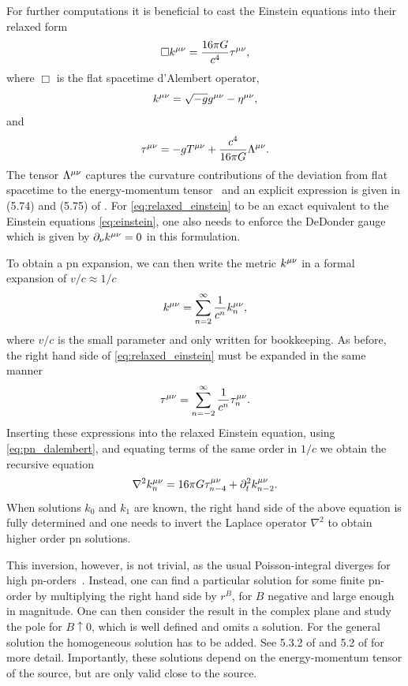 For further computations it is beneficial to cast the Einstein equations into their relaxed form
\begin{equation}\label{eq:relaxed_einstein}
\Box k^{\mu\nu} = \frac{16 \pi G}{c^4}\tau^{\mu\nu},
\end{equation}
where $\Box$ is the flat spacetime d'Alembert operator,
\begin{equation}
k^{\mu\nu} = \sqrt{-g}g^{\mu\nu}-\eta^{\mu\nu},
\end{equation}
and
\begin{equation}
\tau^{\mu\nu}=-gT^{\mu\nu} + \frac{c^4}{16\pi G}\Lambda^{\mu\nu}.
\end{equation}
The tensor $\Lambda^{\mu\nu}$ captures the curvature contributions of the deviation from flat spacetime to the energy-momentum tensor~\cite{Blanchet:2006aaa} %
and an explicit expression is given in (5.74) and (5.75) of \cite{Maggiore:2008aaa}. For \eqref{eq:relaxed_einstein} to be an exact equivalent to the Einstein equations \eqref{eq:einstein}, one also needs to enforce the DeDonder gauge which is given by $\partial_\nu k^{\mu\nu}=0$ in this formulation.

To obtain a \acrshort{pn} expansion, we can then write the metric $k^{\mu\nu}$ in a formal expansion of $v/c\approx 1/c$
\begin{equation}
k^{\mu\nu} = \sum_{n=2}^\infty\frac{1}{c^n} k^{\mu\nu}_n,
\end{equation}
where $v/c$ is the small parameter and only written for bookkeeping. As before, the right hand side of \eqref{eq:relaxed_einstein} must be expanded in the same manner~\cite{Maggiore:2008aaa}%
\begin{equation}
\tau^{\mu\nu}=\sum_{n=-2}^\infty\frac{1}{c^n}\tau^{\mu\nu}_n.
\end{equation}
Inserting these expressions into the relaxed Einstein equation, using \eqref{eq:pn_dalembert}, and equating terms of the same order in $1/c$ we obtain the recursive equation
\begin{equation}
\nabla^2k^{\mu\nu}_n = 16 \pi G \tau^{\mu\nu}_{n-4} + \partial^2_t k^{\mu\nu}_{n-2}.
\end{equation}
When solutions $k_0$ and $k_1$ are known, the right hand side of the above equation is fully determined and one needs to invert the Laplace operator $\nabla^2$ to obtain higher order \acrshort{pn} solutions.

This inversion, however, is not trivial, as the usual Poisson-integral diverges for high \acrshort{pn}-orders~\cite{Maggiore:2008aaa}. %
Instead, one can find a particular solution for some finite \acrshort{pn}-order by multiplying the right hand side by $r^B$, for $B$ negative and large enough in magnitude. One can then consider the result in the complex plane and study the pole for $B\uparrow 0$, which is well defined and omits a solution. For the general solution the homogeneous solution has to be added. See 5.3.2 of \cite{Maggiore:2008aaa} and 5.2 of \cite{Blanchet:2006aaa} for more detail. Importantly, these solutions depend on the energy-momentum tensor of the source, but are only valid close to the source.

